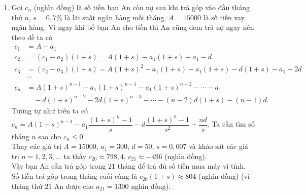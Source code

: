 \begin{ex}
{\begin{enumerate}
\begin{itemize}
        Do đó, $S = d\dfrac{(1+r)^n - 1}{r^2} - \dfrac{nd}{r}$.
    \end{itemize}
    Vậy $b_n = a_1 \dfrac{(1+r)^{n} - 1}{r} + d\dfrac{(1+r)^n - 1}{r^2} - \dfrac{nd}{r}$.
    Ta cần tìm số tháng $n$ sao cho $b_n \ge 15000$.\\
    Thay các giá trị $a_1 = 300$, $d = 50$, $r = 0,006$ và khảo sát các giá trị $n = 1, 2, 3, \ldots$ ta thấy $b_{19} \approx 14866,3$, $b_{20} \approx 16205,5$ (nghìn đồng).\\
    Vậy bạn An cần gửi tiết kiệm trong $20$ tháng để đủ mua máy vi tính.
    \item Gọi $c_n$ (nghìn đồng) là số tiền bạn An còn nợ sau khi trả góp vào đầu tháng thứ $n$, $s=0,7\%$ là lãi suất ngân hàng mỗi tháng, $A=15000$ là số tiền vay ngân hàng. Vì ngay khi bố bạn An cho tiền thì An cũng đem trả nợ ngay nên theo đề ta có
    \begin{align*}
    c_1&= A - a_1\\
    c_2&=(c_1 - a_2)(1+s) = A(1+s) - a_1(1+s) - a_1 - d \\
    c_3&=(c_2 - a_3)(1+s) = A(1+s)^2 - a_1(1+s) - a_1(1+s) - d(1+s) - a_1 - 2d \\
    & \cdots \\
    c_n&=A(1+s)^{n-1} - a_1(1+s)^{n-1} - a_1(1+s)^{n-2} - \cdots - a_1 \\
	&\quad - d(1+s)^{n-2} - 2d(1+s)^{n-3} - \cdots - (n-2)d(1+s) - (n-1)d.
    \end{align*}
    Tương tự như trên ta có
    $c_n = A(1+s)^{n-1} - a_1 \dfrac{(1+s)^{n} - 1}{s} - d\dfrac{(1+s)^n - 1}{s^2} + \dfrac{nd}{s}$.
    Ta cần tìm số tháng $n$ sao cho $c_n \le 0$.\\
    Thay các giá trị $A = 15000$, $a_1 = 300$, $d = 50$, $s = 0,007$ và khảo sát các giá trị $n = 1, 2, 3, \ldots$ ta thấy $c_{20} \approx 798,4$, $c_{21} \approx -496$ (nghìn đồng).\\
    Vậy bạn An cần trả góp trong $21$ tháng để trả đủ số tiền mua máy vi tính.\\
    Số tiền trả góp trong tháng cuối cùng là $c_{20} (1+s) \approx 804$ (nghìn đồng) (vì tháng thứ $21$ An được cho $a_{21}=1300$ nghìn đồng).
    \end{enumerate}
}
\end{ex}